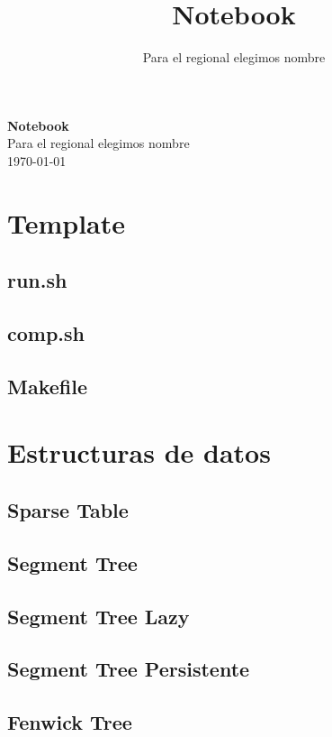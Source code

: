 \documentclass[a4paper,11pt,landscape,twocolumn]{article}
\title{Notebook}
\author{Para el regional elegimos nombre}
\begin{document}
\begin{center}
    \LARGE\textbf{Notebook}\\[1em]
    \large Para el regional elegimos nombre\\[1em]
    \normalsize \today\\[1em]
\end{center}

\tableofcontents
\newpage
\section{Template} %

\subsection{run.sh}

\subsection{comp.sh}

\subsection{Makefile}


\section{Estructuras de datos} %
\subsection{Sparse Table}

\subsection{Segment Tree}

\subsection{Segment Tree Lazy}

\subsection{Segment Tree Persistente}

\subsection{Fenwick Tree}

\end{document}
